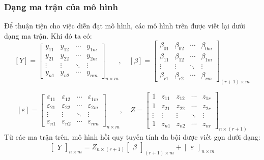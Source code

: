 \begin{frame} 
\frametitle{Dạng ma trận của mô hình} 
Để thuận tiện cho việc diễn đạt mô hình, các mô hình trên được viết lại dưới dạng ma trận. Khi đó ta có: 
\[ [Y] = \begin{bmatrix} y_{11} & y_{12} & \cdots & y_{1m} \\ y_{21} & y_{22} & \cdots & y_{2m} \\ \vdots & \vdots & \ddots & \vdots \\ y_{n1} & y_{n2} & \cdots & y_{nm} \end{bmatrix}_{n \times m}, 
\quad 
[\beta] = \begin{bmatrix} \beta_{01} & \beta_{02} & \cdots & \beta_{0m}\\ \beta_{11} & \beta_{12} & \cdots & \beta_{1m}\\ \vdots & \vdots & \ddots & \vdots\\ \beta_{r1} & \beta_{r2} & \cdots & \beta_{rm} \end{bmatrix}_{(r+1)\times m} \] 

\[ [\varepsilon] = \begin{bmatrix} \varepsilon_{11} & \varepsilon_{12} & \cdots & \varepsilon_{1m}\\ \varepsilon_{21} & \varepsilon_{22} & \cdots & \varepsilon_{2m}\\ \vdots & \vdots & \ddots & \vdots\\ \varepsilon_{n1} & \varepsilon_{n2} & \cdots & \varepsilon_{nm} \end{bmatrix}_{n \times m}, 
\quad 
Z = \begin{bmatrix} 1 & z_{11} & z_{12} & \cdots & z_{1r} \\ 1 & z_{21} & z_{22} & \cdots & z_{2r} \\ \vdots & \vdots & \vdots & \ddots & \vdots \\ 1 & z_{n1} & z_{n2} & \cdots & z_{nr} \end{bmatrix}_{n \times (r+1)} \] 
Từ các ma trận trên, mô hình hồi quy tuyến tính đa bội được viết gọn dưới dạng: 
\[
\begin{bmatrix}
Y
\end{bmatrix}_{n \times m}
=
Z_{n \times (r+1)}
\begin{bmatrix}
\beta
\end{bmatrix}_{(r+1) \times m}
+
\begin{bmatrix}
\varepsilon
\end{bmatrix}_{n \times m}
\]
\end{frame}


